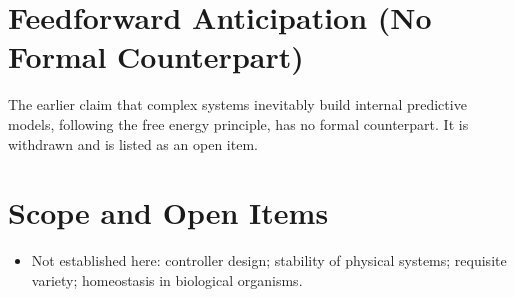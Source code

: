 \documentclass[11pt, a4paper]{article}
\begin{document}
\section{Feedforward Anticipation (No Formal Counterpart)}
The earlier claim that complex systems inevitably build internal predictive models, following the free energy principle, has no formal counterpart. It is withdrawn and is listed as an open item.

\section{Scope and Open Items}
\begin{itemize}
  \item Not established here: controller design; stability of physical systems; requisite variety; homeostasis in biological organisms.
\end{itemize}
\end{document}
